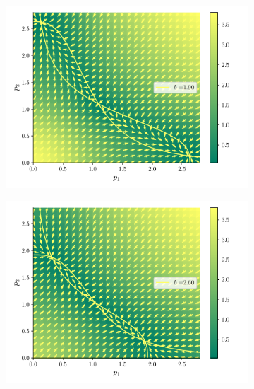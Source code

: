 \documentclass[twocolumn,aps,prl]{revtex4-1}
\begin{document}
\begin{figure}[ht!]
  \centering
  \begin{subfigure}[b]{0.49\linewidth}
      \centering
      \includegraphics[width = 0.999\textwidth]{figuras/ex02-cosa2-0.pdf}
  \end{subfigure}\quad
  \begin{subfigure}[b]{0.49\linewidth}
      \centering
      \includegraphics[width = 0.999\textwidth]{figuras/ex02-cosa2-1.pdf}
  \end{subfigure}\quad
  \begin{subfigure}[b]{0.49\linewidth}
      \centering

\end{subfigure}
\end{figure}
\end{document}

